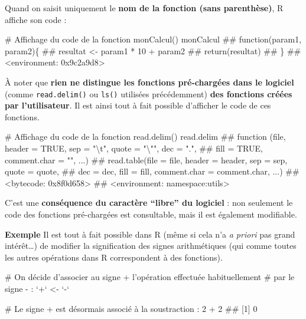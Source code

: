 \documentclass[12pt,twosided, notitlepage]{book}
\newenvironment{Shaded}{}{}
\newcommand{\DataTypeTok}[1]{#1}
\newcommand{\DecValTok}[1]{#1}
\newcommand{\StringTok}[1]{\textcolor[rgb]{0.00,0.50,0.50}{#1}}
\newcommand{\CommentTok}[1]{\textcolor[rgb]{0.00,0.50,0.00}{#1}}
\newcommand{\OperatorTok}[1]{#1}
\newcommand{\NormalTok}[1]{#1}
\renewenvironment{Shaded}{\begin{snugshade}}{\end{snugshade}}
\begin{document}
Quand on saisit uniquement le \textbf{nom de la fonction (sans
parenthèse)}, R affiche son code :

\begin{Shaded}
\begin{Highlighting}[]
\CommentTok{# Affichage du code de la fonction monCalcul()}
\NormalTok{monCalcul}
\NormalTok{  ## function(param1, param2)\{}
\NormalTok{  ##   resultat <- param1 * 10 + param2}
\NormalTok{  ##   return(resultat)}
\NormalTok{  ## \}}
\NormalTok{  ## <environment: 0x9c2a9d8>}
\end{Highlighting}
\end{Shaded}

À noter que \textbf{rien ne distingue les fonctions pré-chargées dans le
logiciel} (comme \texttt{read.delim()} ou \texttt{ls()} utilisées
précédemment) \textbf{des fonctions créées par l'utilisateur}. Il est
ainsi tout à fait possible d'afficher le code de ces
fonctions.

\begin{Shaded}
\begin{Highlighting}[]
\CommentTok{# Affichage du code de la fonction read.delim()}
\NormalTok{read.delim}
\NormalTok{  ## function (file, header = TRUE, sep = "\textbackslash{}t", quote = "\textbackslash{}"", dec = ".", }
\NormalTok{  ##     fill = TRUE, comment.char = "", ...) }
\NormalTok{  ## read.table(file = file, header = header, sep = sep, quote = quote, }
\NormalTok{  ##     dec = dec, fill = fill, comment.char = comment.char, ...)}
\NormalTok{  ## <bytecode: 0x8f0d658>}
\NormalTok{  ## <environment: namespace:utils>}
\end{Highlighting}
\end{Shaded}

C'est une \textbf{conséquence du caractère \enquote{libre} du logiciel}
: non seulement le code des fonctions pré-chargées est consultable, mais
il est également modifiable.

\textbf{Exemple} Il est tout à fait possible dans R (même si cela n'a
\emph{a priori} pas grand intérêt\ldots{}) de modifier la signification
des signes arithmétiques (qui comme toutes les autres opérations dans R
correspondent à des fonctions).

\begin{Shaded}
\begin{Highlighting}[]
\CommentTok{# On décide d'associer au signe + l'opération effectuée habituellement }
\CommentTok{# par le signe - :}
\StringTok{`}\DataTypeTok{+}\StringTok{`}\NormalTok{ <-}\StringTok{ `}\DataTypeTok{-}\StringTok{`}

\CommentTok{# Le signe + est désormais associé à la soustraction :}
\DecValTok{2} \OperatorTok{+}\StringTok{ }\DecValTok{2}
\NormalTok{  ## [1] 0}
\end{Highlighting}
\end{Shaded}
\end{document}
